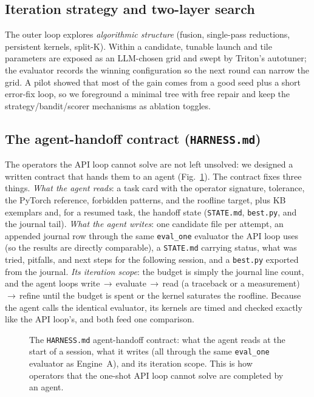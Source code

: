 \documentclass[conference]{IEEEtran}
\begin{document}
\subsection{Iteration strategy and two-layer search}
The outer loop explores \emph{algorithmic structure} (fusion, single-pass
reductions, persistent kernels, split-K). Within a candidate, tunable launch and
tile parameters are exposed as an LLM-chosen grid and swept by Triton's
autotuner; the evaluator records the winning configuration so the next round can
narrow the grid. A pilot showed that most of the gain comes from a good seed plus
a short error-fix loop, so we foreground a minimal tree with free repair and keep
the strategy/bandit/scorer mechanisms as ablation toggles.

\subsection{The agent-handoff contract (\texttt{HARNESS.md})}
The operators the API loop cannot solve are not left unsolved: we designed a
written contract that hands them to an agent (Fig.~\ref{fig:harness}). The
contract fixes three things. \emph{What the agent reads}: a task card with the
operator signature, tolerance, the PyTorch reference, forbidden patterns, and the
roofline target, plus KB exemplars and, for a resumed task, the handoff state
(\texttt{STATE.md}, \texttt{best.py}, and the journal tail). \emph{What the agent
writes}: one candidate file per attempt, an appended journal row through the same
\texttt{eval\_one} evaluator the API loop uses (so the results are directly
comparable), a \texttt{STATE.md} carrying status, what was tried, pitfalls, and
next steps for the following session, and a \texttt{best.py} exported from the
journal. \emph{Its iteration scope}: the budget is simply the journal line count,
and the agent loops write\,$\to$\,evaluate\,$\to$\,read (a traceback or a
measurement)\,$\to$\,refine until the budget is spent or the kernel saturates the
roofline. Because the agent calls the identical evaluator, its kernels are timed
and checked exactly like the API loop's, and both feed one comparison.

\begin{figure}[t]
  \centering
  \resizebox{0.96\textwidth}{!}{}
  \caption{The \texttt{HARNESS.md} agent-handoff contract: what the agent reads at
  the start of a session, what it writes (all through the same \texttt{eval\_one}
  evaluator as Engine~A), and its iteration scope. This is how operators that the
  one-shot API loop cannot solve are completed by an agent.}
  \label{fig:harness}
\end{figure}
\end{document}
